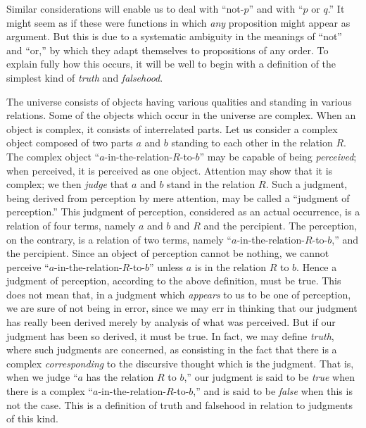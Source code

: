 \documentclass[letterpaper,12pt,openany,leqno]{book}
\newcommand{\pagefirst}[1]{\marginnote[\boxed{\text{#1}}]{\boxed{\text{#1}}}}
\begin{document}
Similar considerations will enable us to deal with ``not-$p$'' and with ``$p$ or $q$.'' It might seem as if these were functions in which \textit{any} proposition might appear as argument. But this is due to a systematic ambiguity in the meanings of ``not'' and ``or,'' by which they adapt themselves to propositions of any order. To explain fully how this occurs, it will be well to begin with a definition of the simplest kind of \textit{truth} and \textit{falsehood}.

The universe consists of objects having various qualities and standing in various relations. Some of the objects which occur in the universe are complex. When an object is complex, it consists of interrelated parts. Let us consider a complex object composed of two parts $a$ and $b$ standing to each other in the relation $R$. The complex object ``$a$-in-the-relation-$R$-to-$b$'' may be capable of being \textit{perceived}; when perceived, it is perceived as one object. Attention may show that it is complex; we then \textit{judge} that $a$ and $b$ stand in the relation $R$. Such a judgment, being derived from perception by mere attention, may be called a ``judgment of perception.'' This judgment of perception, considered as an actual occurrence, is a relation of four terms, namely $a$ and $b$ and $R$ and the percipient. The perception, on the contrary, is a relation of two terms, namely ``$a$-in-the-relation-$R$-to-$b$,'' and the percipient. Since an object of perception cannot be nothing, we cannot perceive ``$a$-in-the-relation-$R$-to-$b$'' unless $a$ is in the relation $R$ to $b$. Hence a judgment of perception, according to the above definition, must be true. This does not mean that, in a judgment which \textit{appears} to us to be one of perception, we are sure of not being in error, since we may err in thinking that our judgment has really been derived merely by analysis of \pagefirst{46} what was perceived. But if our judgment has been so derived, it must be true. In fact, we may define \textit{truth}, where such judgments are concerned, as consisting in the fact that there is a complex \textit{corresponding} to the discursive thought which is the judgment. That is, when we judge ``$a$ has the relation $R$ to $b$,'' our judgment is said to be \textit{true} when there is a complex ``$a$-in-the-relation-$R$-to-$b$,'' and is said to be \textit{false} when this is not the case. This is a definition of truth and falsehood in relation to judgments of this kind.
\end{document}
